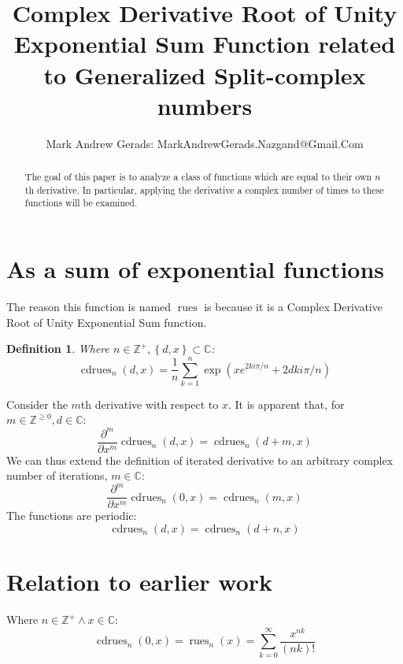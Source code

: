 \documentclass[]{article}
\author{Mark Andrew Gerads: MarkAndrewGerads.Nazgand@Gmail.Com}
\title{Complex Derivative Root of Unity Exponential Sum Function related to Generalized Split-complex numbers}
\DeclareMathOperator{\rues}{rues}
\DeclareMathOperator{\cdrues}{cdrues}
\newcommand{\pqty}[1]{{\left(#1\right)}}
\newcommand{\Bqty}[1]{{\left\{#1\right\}}}
\newcommand{\pdiff}[2]{\frac{\partial^{#2}}{\partial #1^{#2}}}
\newtheorem{definition}[theorem]{Definition}
\numberwithin{equation}{section}
\begin{document}
	
	\maketitle
	
	\begin{abstract}
		The goal of this paper is to analyze a class of functions which are equal to their own \(n\)th derivative. In particular, applying the derivative a complex number of times to these functions will be examined.
	\end{abstract}
	
	\section{As a sum of exponential functions}
	The reason this function is named $\rues$ is because it is a Complex Derivative Root of Unity Exponential Sum function.
	\begin{definition}
		Where $n\in\mathbb{Z}^+,\Bqty{d,x}\subset\mathbb{C}$:
		\begin{equation}
		\label{cdrues Exponential sum form}
		\cdrues_n\pqty{d,x}=
		\frac{1}{n}\sum _{k=1}^n \exp\pqty{xe^{2ki\pi/n}+2dki\pi/n}
		\end{equation}
	\end{definition}
	Consider the $m$th derivative with respect to $x$. It is apparent that, for $m\in\mathbb{Z}^{\geq 0},d\in\mathbb{C}$:
	\begin{equation}
	\pdiff{x}{m}\cdrues_n\pqty{d,x}=\cdrues_n\pqty{d+m,x}
	\end{equation}
	We can thus extend the definition of iterated derivative to an arbitrary complex number of iterations, $m\in\mathbb{C}$:
	\begin{equation}
	\pdiff{x}{m}\cdrues_n\pqty{0,x}=\cdrues_n\pqty{m,x}
	\end{equation}
	The functions are periodic:
	\begin{equation}
	\cdrues_n\pqty{d,x}=\cdrues_n\pqty{d+n,x}
	\end{equation}
	
	\section{Relation to earlier work}
	Where \(n\in\mathbb{Z}^+\land x\in\mathbb{C}\):
	\begin{equation}
	\cdrues_n\pqty{0,x}=
	\rues_n\pqty{x}=
	\sum_{k=0}^{\infty}\frac{x^{nk}}{\pqty{nk}!}
	\end{equation}
\end{document}
